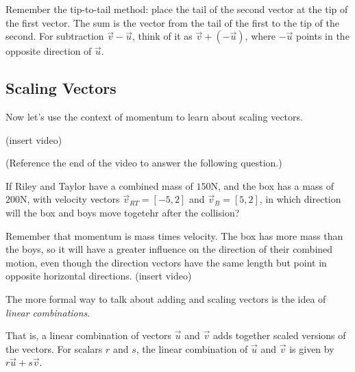 \documentclass{ximera}
\begin{document}
\begin{problem}
    \begin{feedback}
        Remember the tip-to-tail method: place the tail of the second vector at the tip of the first vector. The sum is the vector from the tail of the first to the tip of the second. For subtraction $\vec{v}-\vec{u}$, think of it as $\vec{v}+(-\vec{u})$, where $-\vec{u}$ points in the opposite direction of $\vec{u}$.
    \end{feedback}
\end{problem}

\subsection*{Scaling Vectors}

Now let's use the context of momentum to learn about scaling vectors.

(insert video)

\begin{problem}
    (Reference the end of the video to answer the following question.)
    
    If Riley and Taylor have a combined mass of $150$N, and the box has a mass of $200$N, with velocity vectors $\vec{v}_{RT}=[-5,2]$ and $\vec{v}_B=[5,2]$, in which direction will the box and boys move togetehr after the collision?
    \begin{multipleChoice}
    \end{multipleChoice}
    \begin{feedback}
        Remember that momentum is mass times velocity. The box has more mass than the boys, so it will have a greater influence on the direction of their combined motion, even though the direction vectors have the same length but point in opposite horizontal directions.
        (insert video)
    \end{feedback}
\end{problem}

\begin{definition}
The more formal way to talk about adding and scaling vectors is the idea of \emph{linear combinations}. 

That is, a linear combination of vectors $\vec{u}$ and $\vec{v}$ adds together scaled versions of the vectors. For scalars $r$ and $s$, the linear combination of $\vec{u}$ and $\vec{v}$ is given by $r\vec{u}+s\vec{v}$.
\end{definition}
\end{document}
